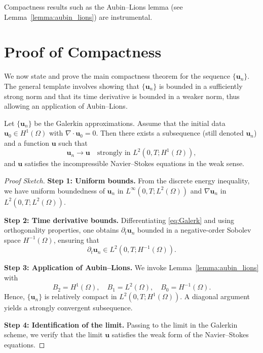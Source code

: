 \documentclass[11pt]{article}
\numberwithin{equation}{section}
\begin{document}
\begin{remark}
Compactness results such as the Aubin--Lions lemma
(see Lemma~\ref{lemma:aubin_lions}) are instrumental.
\end{remark}

\section{Proof of Compactness}\label{sec:compactness}

We now state and prove the main compactness theorem for the sequence
\(\{\mathbf{u}_n\}\). The general template involves showing that
\(\{\mathbf{u}_n\}\) is bounded in a sufficiently strong norm and that
its time derivative is bounded in a weaker norm, thus allowing an application
of Aubin--Lions.

\begin{theorem}
\label{thm:compactness}
Let \(\{\mathbf{u}_n\}\) be the Galerkin approximations. Assume that
the initial data \(\mathbf{u}_0\in H^1(\Omega)\) with \(\nabla\cdot\mathbf{u}_0=0\).
Then there exists a subsequence (still denoted \(\mathbf{u}_n\))
and a function \(\mathbf{u}\) such that
\[
\mathbf{u}_n \to \mathbf{u} \quad \text{strongly in } L^2(0,T;H^1(\Omega)),
\]
and \(\mathbf{u}\) satisfies the incompressible Navier--Stokes equations
in the weak sense.
\end{theorem}

\begin{proof}[Proof Sketch]
\textbf{Step 1: Uniform bounds.}
From the discrete energy inequality, we have uniform boundedness of
\(\mathbf{u}_n\) in \(L^\infty(0,T;L^2(\Omega))\) and
\(\nabla \mathbf{u}_n\) in \(L^2(0,T;L^2(\Omega))\).

\noindent
\textbf{Step 2: Time derivative bounds.}
Differentiating \eqref{eq:Galerk} and using orthogonality properties,
one obtains \(\partial_t \mathbf{u}_n\) bounded in a negative-order Sobolev space
\(H^{-1}(\Omega)\), ensuring that
\[
\partial_t \mathbf{u}_n \in L^2(0,T;H^{-1}(\Omega)).
\]

\noindent
\textbf{Step 3: Application of Aubin--Lions.}
We invoke Lemma~\ref{lemma:aubin_lions} with
\[
B_2 = H^1(\Omega),\quad B_1 = L^2(\Omega), \quad B_0 = H^{-1}(\Omega).
\]
Hence, \(\{\mathbf{u}_n\}\) is relatively compact in \(L^2(0,T;H^1(\Omega))\).
A diagonal argument yields a strongly convergent subsequence.

\noindent
\textbf{Step 4: Identification of the limit.}
Passing to the limit in the Galerkin scheme, we verify that the limit \(\mathbf{u}\)
satisfies the weak form of the Navier--Stokes equations.
\end{proof}
\end{document}
